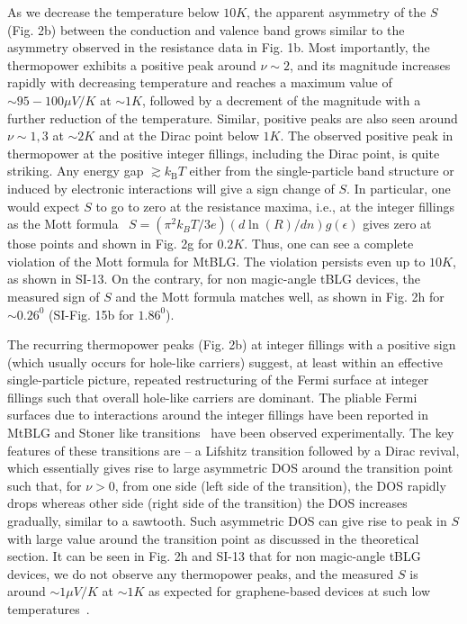 \documentclass{nature}
\begin{document}
As we decrease the temperature below $10K$, the apparent asymmetry of the $S$ (Fig. 2b) between the conduction and valence band grows similar to the asymmetry observed in the resistance data in Fig. 1b. Most importantly, the thermopower exhibits a positive peak around $\nu \sim 2$, and its magnitude increases rapidly with decreasing temperature and reaches a maximum value of $\sim 95-100\mu V/K$ at $\sim 1K$, followed by a decrement of the magnitude with a further reduction of the temperature. Similar, positive peaks are also seen around $\nu \sim 1,3$ at $\sim 2K$ and at the Dirac point below $1K$. %
The observed positive peak in thermopower at the positive integer fillings, including the Dirac point, is quite striking. Any energy gap $\gtrsim k_\mathrm{B}T$ either from the single-particle band structure or induced by electronic interactions will give a sign change of $S$. In particular, one would expect $S$ to go to zero at the resistance maxima, i.e., at the integer fillings as the Mott formula~\cite{PhysRev.181.1336} $S=(\pi^2 k_B T/3e)(d\ln(R)/dn)g(\epsilon)$ %
gives zero at those points and shown in Fig. 2g for $0.2K$. %
Thus, one can see a complete violation of the Mott formula for MtBLG. The violation persists even up to $10K$, as shown in SI-13. On the contrary, for non magic-angle tBLG devices, the measured sign of $S$ and the Mott formula matches well, as shown in Fig. 2h for $\sim 0.26^0$ (SI-Fig. 15b for $1.86^0$).


The recurring thermopower peaks (Fig. 2b) at integer fillings with a positive sign (which usually occurs for hole-like carriers) suggest, at least within an effective single-particle picture, repeated restructuring of the Fermi surface at integer fillings such that overall hole-like carriers are dominant. The pliable Fermi surfaces due to interactions around the integer fillings have been reported in MtBLG and Stoner like transitions~\cite{wong2020cascade,zondiner2020cascade,wu2021chern,park_tunable_2021} have been observed experimentally. The key features of these transitions are -- a Lifshitz transition followed by a Dirac revival, which essentially gives rise to large asymmetric DOS around the transition point such that, for $\nu>0$, from one side (left side of the transition), the DOS rapidly drops whereas other side (right side of the transition) the DOS increases gradually, similar to a sawtooth. Such asymmetric DOS can give rise to peak in $S$ with large value around the transition point as discussed in the theoretical section. It can be seen in Fig. 2h and SI-13 that for non magic-angle %
tBLG devices, we do not observe any thermopower peaks, and the measured $S$ is around $\sim 1\mu V/K$ at $\sim 1K$ as expected for graphene-based devices at such low temperatures~\cite{zuev2009thermoelectric,PhysRevB.80.081413,nam2010thermoelectric}.
\end{document}
